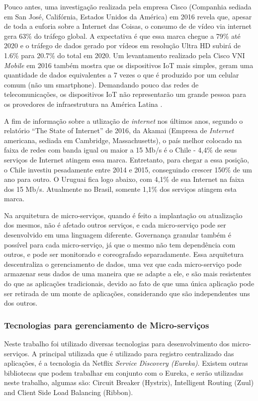 \documentclass[journal]{IEEEtran}
\begin{document}
Pouco antes, uma investigação realizada pela empresa Cisco (Companhia sediada em San José, Califórnia, Estados Unidos da América) em 2016 revela que, apesar de toda a euforia sobre a Internet das Coisas, o consumo de de vídeo via internet gera 63\% do tráfego global. A expectativa é que essa marca chegue a 79\% até 2020 e o tráfego de dados gerado por vídeos em resolução Ultra HD subirá de 1.6\% para 20.7\% do total em 2020. Um levantamento realizado pela Cisco VNI \emph{Mobile} em 2016 também mostra que os dispositivos IoT mais simples, geram uma quantidade de dados equivalentes a 7 vezes o que é produzido por um celular comum (não um smartphone). Demandando pouco das redes de telecomunicações, os dispositivos IoT não representarão um grande pessoa para os provedores de infraestrutura na América Latina \cite{idc2017}. 

A fim de informação sobre a utlização de \emph{internet} nos últimos anos, segundo o relatório “The State of Internet” de 2016, da Akamai (Empresa de \emph{Internet} americana, sediada em Cambridge, Massachusetts), o país melhor colocado na faixa de redes com banda igual ou maior a 15 Mb/s é o Chile - 4,4\% de seus serviços de Internet atingem essa marca. Entretanto, para chegar a essa posição, o Chile investiu pesadamente entre 2014 e 2015, conseguindo crescer 150\% de um ano para outro. O Uruguai fica logo abaixo, com 4,1\% de sua Internet na faixa dos 15 Mb/s. Atualmente no Brasil, somente 1,1\% dos serviços atingem esta marca.

Na arquitetura de micro-serviços, quando é feito a implantação ou atualização dos mesmos, não é afetado outros serviços, e cada micro-serviço pode ser desenvolvido em uma linguagem diferente. Governança granular também é possível para cada micro-serviço, já que o mesmo não tem dependência com outros, e pode ser monitorado e coreografado separadamente. Essa arquitetura descentraliza o gerenciamento de dados, uma vez que cada micro-serviço pode armazenar seus dados de uma maneira que se adapte a ele, e são mais resistentes do que as aplicações tradicionais, devido ao fato de que uma única aplicação pode ser retirada de um monte de aplicações, considerando que são independentes uns dos outros.

\subsubsection{Tecnologias para gerenciamento de Micro-serviços}
Neste trabalho foi utilizado diversas tecnologias para desenvolvimento dos micro-serviços. A principal utilizada que é utilizado para registro centralizado das aplicações, é a tecnologia da Netflix \emph{Service Discovery (Eureka)}. Existem outras bibliotecas que podem trabalhar em conjunto com o Eureka, e serão utilizadas neste trabalho, algumas são: Circuit Breaker (Hystrix), Intelligent Routing (Zuul) and Client Side Load Balancing (Ribbon). 
\end{document}
